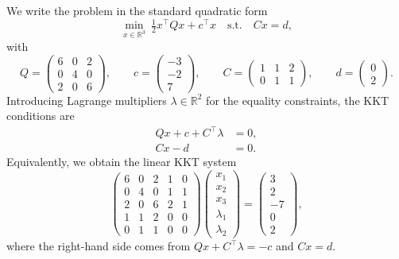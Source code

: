 \documentclass[11pt]{article}
\begin{document}
We write the problem in the standard quadratic form
\begin{equation*}
\min_{x\in\mathbb{R}^3} \ \tfrac12 x^\top Q x + c^\top x
\quad\text{s.t.}\quad Cx = d,
\end{equation*}
with
\begin{equation*}
Q =
\begin{pmatrix}
6 & 0 & 2\\
0 & 4 & 0\\
2 & 0 & 6
\end{pmatrix},\qquad
c =
\begin{pmatrix}
-3\\
-2\\
7
\end{pmatrix},\qquad
C =
\begin{pmatrix}
1 & 1 & 2\\
0 & 1 & 1
\end{pmatrix},\qquad
d =
\begin{pmatrix}
0\\
2
\end{pmatrix}.
\end{equation*}
Introducing Lagrange multipliers $\lambda\in\mathbb{R}^2$ for the equality constraints, the KKT conditions are
\begin{align*}
Qx + c + C^\top\lambda &= 0,\\
Cx - d &= 0.
\end{align*}
Equivalently, we obtain the linear KKT system
\begin{equation*}
\begin{pmatrix}
6 & 0 & 2 & 1 & 0\\
0 & 4 & 0 & 1 & 1\\
2 & 0 & 6 & 2 & 1\\
1 & 1 & 2 & 0 & 0\\
0 & 1 & 1 & 0 & 0
\end{pmatrix}
\begin{pmatrix}
x_1\\ x_2\\ x_3\\ \lambda_1\\ \lambda_2
\end{pmatrix}
=
\begin{pmatrix}
3\\ 2\\ -7\\ 0\\ 2
\end{pmatrix},
\end{equation*}
where the right-hand side comes from $Qx + C^\top\lambda = -c$ and $Cx = d$.
\end{document}

